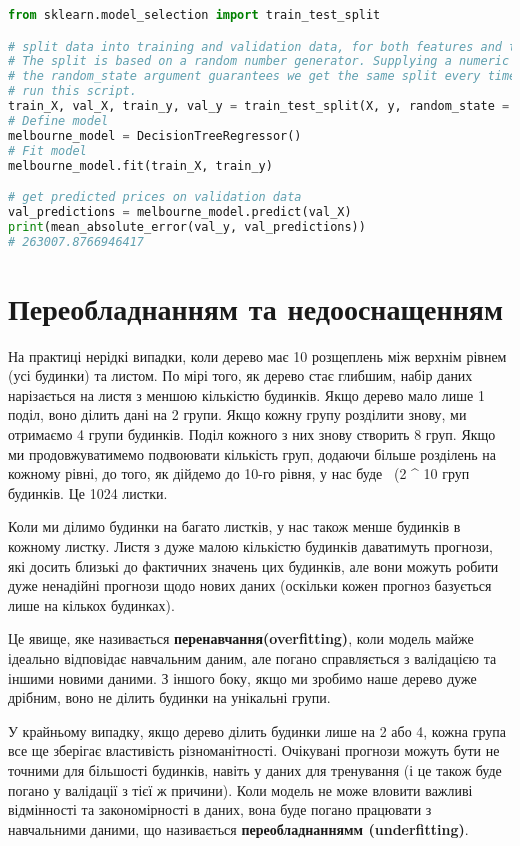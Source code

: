 \begin{lstlisting}[style=light, language=Python,label={lst:vectorimg},caption=The mean absolute error calculcation]
from sklearn.model_selection import train_test_split

# split data into training and validation data, for both features and target
# The split is based on a random number generator. Supplying a numeric value to
# the random_state argument guarantees we get the same split every time we
# run this script.
train_X, val_X, train_y, val_y = train_test_split(X, y, random_state = 0)
# Define model
melbourne_model = DecisionTreeRegressor()
# Fit model
melbourne_model.fit(train_X, train_y)

# get predicted prices on validation data
val_predictions = melbourne_model.predict(val_X)
print(mean_absolute_error(val_y, val_predictions))
# 263007.8766946417
\end{lstlisting}

\section{Переобладнанням та недооснащенням}\label{sec:underfitting_overfitting}
На практиці нерідкі випадки, коли дерево має 10 розщеплень між верхнім рівнем (усі будинки) та листом.
По мірі того, як дерево стає глибшим, набір даних нарізається на листя з меншою кількістю будинків.
Якщо дерево мало лише 1 поділ, воно ділить дані на 2 групи.
Якщо кожну групу розділити знову, ми отримаємо 4 групи будинків.
Поділ кожного з них знову створить 8 груп.
Якщо ми продовжуватимемо подвоювати кількість груп, додаючи більше розділень на кожному рівні, до того, як дійдемо до 10-го рівня, у нас буде \ (2 ^ 10 \) груп будинків.
Це 1024 листки.

Коли ми ділимо будинки на багато листків, у нас також менше будинків в кожному листку.
Листя з дуже малою кількістю будинків даватимуть прогнози, які досить близькі до фактичних значень цих будинків, але вони можуть робити дуже ненадійні прогнози щодо нових даних (оскільки кожен прогноз базується лише на кількох будинках).

Це явище, яке називається \textbf{перенавчання(overfitting)}, коли модель майже ідеально відповідає навчальним даним, але погано справляється з валідацією та іншими новими даними.
З іншого боку, якщо ми зробимо наше дерево дуже дрібним, воно не ділить будинки на унікальні групи.

У крайньому випадку, якщо дерево ділить будинки лише на 2 або 4, кожна група все ще зберігає властивість різноманітності.
Очікувані прогнози можуть бути не точними для більшості будинків, навіть у даних для тренування (і це також буде погано у валідації з тієї ж причини).
Коли модель не може вловити важливі відмінності та закономірності в даних, вона буде погано працювати з навчальними даними, що називається \textbf{переобладнаннямм (underfitting)}.

